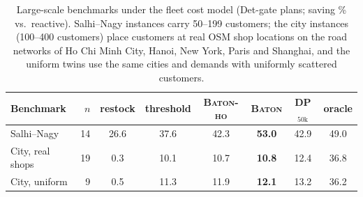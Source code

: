 \begin{table}[t]
\caption{Large-scale benchmarks under the fleet cost model
(Det-gate plans; saving \% vs.\ reactive). Salhi--Nagy instances carry
50--199 customers; the city instances (100--400 customers) place
customers at real OSM shop locations on the road networks of Ho Chi Minh
City, Hanoi, New York, Paris and Shanghai, and the uniform twins use the
same cities and demands with uniformly scattered customers.}
\label{tab:large}
\centering
\small
\setlength{\tabcolsep}{4pt}
\begin{tabular}{l r cccccc}
\toprule
Benchmark & $n$ & restock & threshold & \textsc{Baton-ho} &
\textsc{Baton} & DP$_{50\mathrm{k}}$ & oracle \\
\midrule
Salhi--Nagy & 14 & 26.6 & 37.6 & 42.3 & \textbf{53.0} & 42.9 & 49.0 \\
City, real shops & 19 & 0.3 & 10.1 & 10.7 & \textbf{10.8} & 12.4 & 36.8 \\
City, uniform & 9 & 0.5 & 11.3 & 11.9 & \textbf{12.1} & 13.2 & 36.2 \\
\bottomrule
\end{tabular}
\end{table}
